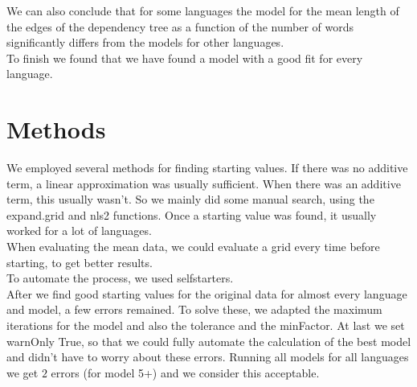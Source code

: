 \documentclass[paper=a4, fontsize=11pt]{scrartcl} %
\begin{document}
We can also conclude that for some languages the model for the mean length of the edges of the dependency tree as a function of the number of words significantly differs from the models for other languages.\\

To finish we found that we have found a model with a good fit for every language.

\section{Methods}
We employed several methods for finding starting values. If there was no additive term, a linear approximation was usually sufficient. When there was an additive term, this usually wasn't. So we mainly did some manual search, using the expand.grid and nls2 functions. Once a starting value was found, it usually worked for a lot of languages.\\
When evaluating the mean data, we could evaluate a grid every time before starting, to get better results.\\
To automate the process, we used selfstarters.\\

After we find good starting values for the original data for almost every language and model, a few errors remained. To solve these, we adapted the maximum iterations for the model and also the tolerance and the minFactor. At last we set warnOnly True, so that we could fully automate the calculation of the best model and didn't have to worry about these errors. Running all models for all languages we get $2$ errors (for model 5+) and we consider this acceptable.
\end{document}
